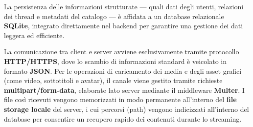 La persistenza delle informazioni strutturate — quali dati degli utenti, relazioni dei thread e metadati del catalogo — è affidata a un database relazionale \textbf{SQLite}, integrato direttamente nel backend per garantire una gestione dei dati leggera ed efficiente. 

La comunicazione tra client e server avviene esclusivamente tramite protocollo \textbf{HTTP/HTTPS}, dove lo scambio di informazioni standard è veicolato in formato \textbf{JSON}. Per le operazioni di caricamento dei media e degli asset grafici (come video, sottotitoli e avatar), il canale viene gestito tramite richieste \textbf{multipart/form-data}, elaborate lato server mediante il middleware \textbf{Multer}. I file così ricevuti vengono memorizzati in modo permanente all'interno del \textbf{file storage locale} del server, i cui percorsi (path) vengono indicizzati all'interno del database per consentire un recupero rapido dei contenuti durante lo streaming.